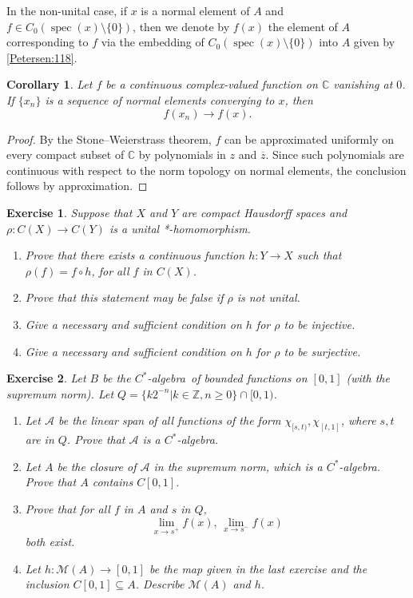 \documentclass{book}
\newtheorem{exercise}{Exercise}[section]
\newtheorem{corollary}[definition]{Corollary}
\def\cstar{\(C^*\)-algebra}
\begin{document}
In the non-unital case, if \(x\) is a normal element of \(A\) and
\(f\in C_0(\operatorname{spec}(x)\setminus\{0\})\), then we denote by
\(f(x)\) the element of \(A\) corresponding to \(f\) via the embedding of
\(C_0(\operatorname{spec}(x)\setminus\{0\})\) into \(A\) given by \ref{Petersen:118}.
\begin{corollary}\label{Petersen:119}
  Let \(f\) be a continuous complex-valued function on \(\mathbb C\) vanishing at \(0\).
  If \(\{x_n\}\) is a sequence of normal elements converging to \(x\), then
  \[
    f(x_n)\longrightarrow f(x).
  \]
\end{corollary}
\begin{proof}
  By the Stone--Weierstrass theorem, \(f\) can be approximated uniformly on every compact subset of \(\mathbb C\) 
  by polynomials in \(z\) and \(\overline z\). 
  Since such polynomials are continuous with respect to the norm topology on normal elements, 
  the conclusion follows by approximation.
\end{proof}
\begin{exercise}\label{ex:142}
  Suppose that \(X\) and \(Y\) are compact Hausdorff spaces and
  \(\rho : C(X) \rightarrow C(Y)\) is a unital *-homomorphism.    
  \begin{enumerate}
    \item Prove that there exists a continuous function \(h : Y \rightarrow X\) such that
    \(\rho(f) = f \circ h\), for all \(f\) in \(C(X)\).
    \item Prove that this statement may be false if \(\rho\) is not unital.
    \item Give a necessary and sufficient condition on \(h\) for \(\rho\) to be injective.
    \item Give a necessary and sufficient condition on \(h\) for \(\rho\) to be surjective.
  \end{enumerate}
\end{exercise}
\begin{exercise}
  Let \(B\) be the \cstar\ of bounded functions on \([0,1]\) (with the supremum norm). 
  Let \(Q = \{k2^{-n} | k \in \mathbb{Z},n \geq 0\}\cap [0,1)\).
  \begin{enumerate}
    \item Let \(\mathcal{A}\) be the linear span of all functions of the form \(\chi_{[s,t)},\chi_{[t,1]}\), where
    \(s, t\) are in \(Q\). Prove that \(\mathcal{A}\) is a \cstar.
    \item Let \(A\) be the closure of \(\mathcal{A}\) in the supremum norm, which is a \cstar.
    Prove that \(A\) contains \(C[0,1]\).
    \item Prove that for all \(f\) in \(A\) and \(s\) in \(Q\),
    \[
      \lim_{x\rightarrow s^+}f(x)\mbox{, }\lim_{x\rightarrow s^-}f(x)
    \]
    both exist.
    \item Let \(h : \mathcal{M}(A) \rightarrow [0,1]\) be the map given in the last exercise and the
    inclusion \(C[0,1] \subseteq A\). Describe \(\mathcal{M}(A)\) and \(h\).
  \end{enumerate}
\end{exercise}
\end{document}
